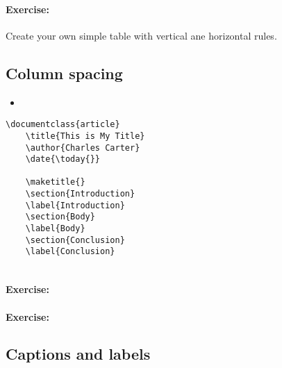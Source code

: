         \paragraph{Exercise:} Create your own simple table with vertical ane horizontal rules.

        \subsection{Column spacing}
        \label{Column spacing}
        
        \begin{framed}
            \begin{itemize}
                \item{}
            \end{itemize}
        \end{framed}


        \begin{verbatim}
\documentclass{article}
    \title{This is My Title}
    \author{Charles Carter}
    \date{\today{}}
 
    \maketitle{}
    \section{Introduction}
    \label{Introduction}
    \section{Body}
    \label{Body}
    \section{Conclusion}
    \label{Conclusion}
    
        \end{verbatim}

        \paragraph{Exercise:}

        \paragraph{Exercise:}


        \subsection{Captions and labels}
        \label{Captions and labels}
        
